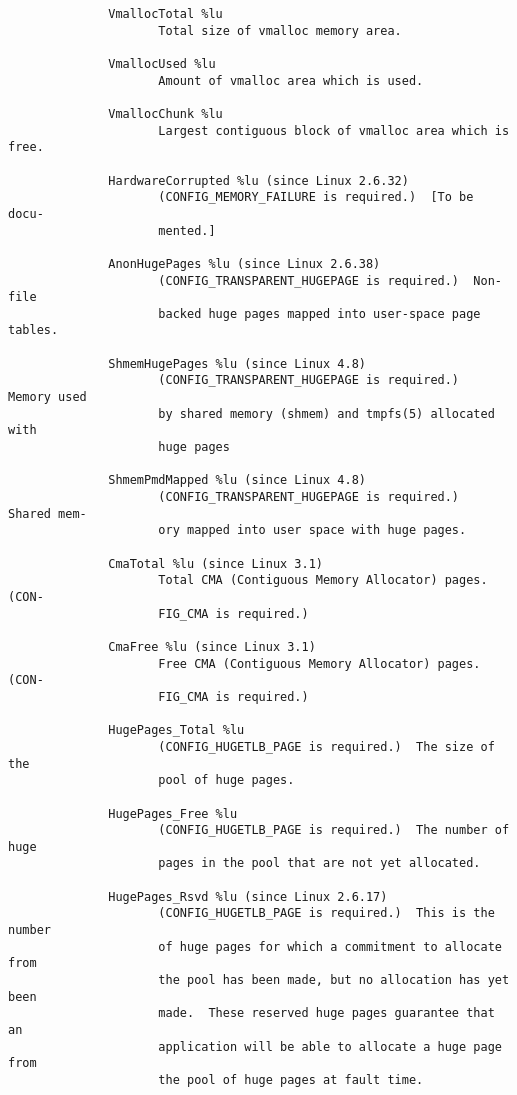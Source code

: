 \documentclass[]{article}
\begin{document}
\begin{verbatim}
              VmallocTotal %lu
                     Total size of vmalloc memory area.

              VmallocUsed %lu
                     Amount of vmalloc area which is used.

              VmallocChunk %lu
                     Largest contiguous block of vmalloc area which is free.

              HardwareCorrupted %lu (since Linux 2.6.32)
                     (CONFIG_MEMORY_FAILURE is required.)  [To be docu‐
                     mented.]

              AnonHugePages %lu (since Linux 2.6.38)
                     (CONFIG_TRANSPARENT_HUGEPAGE is required.)  Non-file
                     backed huge pages mapped into user-space page tables.

              ShmemHugePages %lu (since Linux 4.8)
                     (CONFIG_TRANSPARENT_HUGEPAGE is required.)  Memory used
                     by shared memory (shmem) and tmpfs(5) allocated with
                     huge pages

              ShmemPmdMapped %lu (since Linux 4.8)
                     (CONFIG_TRANSPARENT_HUGEPAGE is required.)  Shared mem‐
                     ory mapped into user space with huge pages.

              CmaTotal %lu (since Linux 3.1)
                     Total CMA (Contiguous Memory Allocator) pages.  (CON‐
                     FIG_CMA is required.)

              CmaFree %lu (since Linux 3.1)
                     Free CMA (Contiguous Memory Allocator) pages.  (CON‐
                     FIG_CMA is required.)

              HugePages_Total %lu
                     (CONFIG_HUGETLB_PAGE is required.)  The size of the
                     pool of huge pages.

              HugePages_Free %lu
                     (CONFIG_HUGETLB_PAGE is required.)  The number of huge
                     pages in the pool that are not yet allocated.

              HugePages_Rsvd %lu (since Linux 2.6.17)
                     (CONFIG_HUGETLB_PAGE is required.)  This is the number
                     of huge pages for which a commitment to allocate from
                     the pool has been made, but no allocation has yet been
                     made.  These reserved huge pages guarantee that an
                     application will be able to allocate a huge page from
                     the pool of huge pages at fault time.


\end{verbatim}
\end{document}
